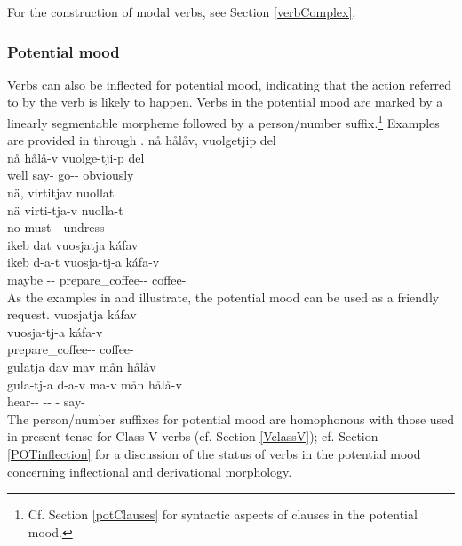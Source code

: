 For the construction of modal verbs, see Section \ref{verbComplex}. 


\subsubsection{Potential mood}\label{POTmood}
Verbs can also be inflected for potential mood, indicating that the action referred to by the verb is likely to happen. Verbs in the potential mood are marked by a linearly segmentable morpheme  followed by a person/number suffix.\footnote{Cf. Section \ref{potClauses} for syntactic aspects of clauses in the potential mood.} 
Examples are provided in  through .
\ea\label{potentialEx1}
\glll	nå hålåv, vuolgetjip del\\
	nå hålå-v vuolge-tji-p del\\
	well say- go-- obviously\\\nopagebreak
{}	
\z
\ea\label{potentialEx2}
\glll	nä, virtitjav nuollat\\
	nä virti-tja-v nuolla-t\\
	no must-- undress-\\\nopagebreak
{}	
\z
\ea\label{potentialEx3}
\glll	ikeb dat vuosjatja káfav\\
	ikeb d-a-t vuosja-tj-a káfa-v\\
	maybe -- prepare\_coffee-- coffee-\\\nopagebreak
{}	
\z
As the examples in  and  illustrate, the potential mood can be used as a friendly request. 
\ea\label{potentialEx4}%
\glll	vuosjatja káfav\\
	vuosja-tj-a káfa-v\\
	prepare\_coffee-- coffee-\\\nopagebreak
{}	
\z
\ea\label{potentialEx5}%
\glll	gulatja dav mav mån hålåv\\
	gula-tj-a d-a-v ma-v mån hålå-v\\
	hear-- -- -  say-\\\nopagebreak
{}	
\z
The person/number suffixes for potential mood are homophonous %
with those used in present tense for Class V verbs (cf. Section \ref{VclassV}); cf. Section \ref{POTinflection} for a discussion of the status of verbs in the potential mood concerning inflectional and derivational morphology. 


